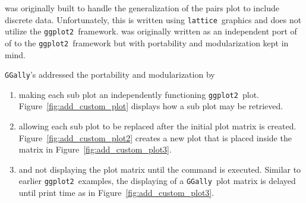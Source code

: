 \documentclass[stat,dissertation]{puthesis}\usepackage[]{graphicx}\usepackage{xcolor}
\newcommand{\pkg}[1]{\texttt{#1}}
\newcommand{\ggplot}{\pkg{ggplot2}}
\newcommand{\GGally}{\pkg{GGally}}
\begin{document}
 was originally built to handle the generalization of the pairs plot to include discrete data.  Unfortunately, this is written using \pkg{lattice}~graphics and does not utilize the \ggplot~framework.   was originally written as an independent port of of  to the \ggplot~framework but with portability and modularization kept in mind.

\GGally's  addressed the portability and modularization by
\begin{enumerate}
  \item making each sub plot an independently functioning \ggplot~plot.  Figure~\ref{fig:add_custom_plot} displays how a sub plot may be retrieved.
  \item allowing each sub plot to be replaced after the initial plot matrix is created.  Figure~\ref{fig:add_custom_plot2} creates a new plot that is placed inside the matrix in Figure~\ref{fig:add_custom_plot3}.
  \item and not displaying the plot matrix until the  command is executed.  Similar to earlier \ggplot~examples, the displaying of a \GGally~plot matrix is delayed until print time as in Figure~\ref{fig:add_custom_plot3}.
\end{enumerate}
\end{document}
